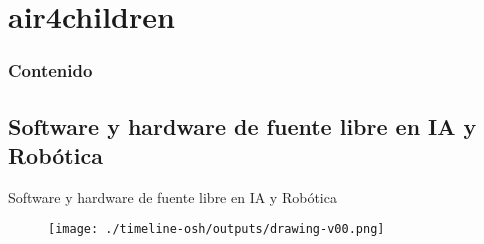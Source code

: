 \section{air4children}


\begin{frame}
      \frametitle{Contenido}
      \tableofcontents[currentsection]
\end{frame}


\subsection{
Software y hardware de fuente libre en IA y Rob\'otica
}

{
\begin{frame}{
Software y hardware de fuente libre en IA y Rob\'otica
}

      \begin{figure}
        \centering
        \texttt{[image: ./timeline-osh/outputs/drawing-v00.png]}
      \end{figure}
\end{frame}
}

